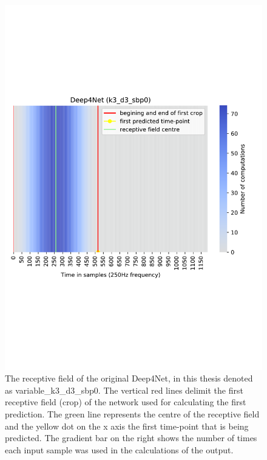 \begin{figure}[!htbp]
\centering
\includegraphics[width=0.8\linewidth]{img/ch3/deep4net-receptive-field}
\caption{The receptive field of the original Deep4Net, in this thesis denoted as {variable}\_k3\_d3\_sbp0. The vertical red lines delimit the first receptive field (crop) of the network used for calculating the first prediction. The green line represents the centre of the receptive field and the yellow dot on the x axis the first time-point that is being predicted. The gradient bar on the right shows the number of times each input sample was used in the calculations of the output.}
\label{fig:receptive-field}
\end{figure}

